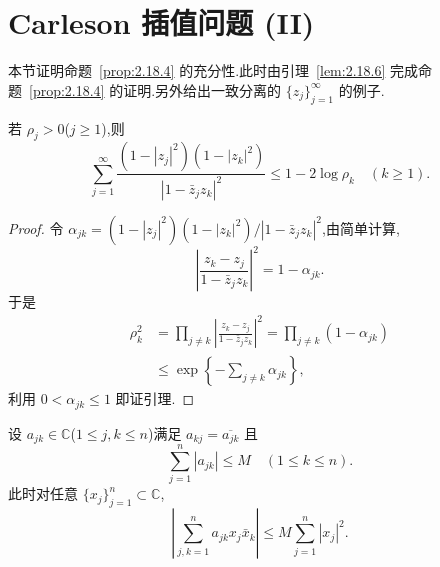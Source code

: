 \section{Carleson 插值问题 (II)}\label{sec:2.19}

本节证明命题~\ref{prop:2.18.4} 的充分性.此时由引理~\ref{lem:2.18.6} 完成命题~\ref{prop:2.18.4} 的证明.另外给出一致分离的 $\{z_{j}\}_{j=1}^{\infty}$ 的例子.

\begin{lemma}\label{lem:2.19.1}
若 $\rho_{j} > 0$($j \geq 1$),则
\begin{equation*}
\sum_{j=1}^{\infty}\frac{(1 - |z_{j}|^{2})(1 - |z_{k}|^{2})}{|1 - \bar{z}_{j}z_{k}|^{2}} \leq 1 - 2\log\rho_{k} \quad (k \geq 1).
\end{equation*}
\end{lemma}

\begin{proof}
令 $\alpha_{jk} = (1 - |z_{j}|^{2})(1 - |z_{k}|^{2})/|1 - \bar{z}_{j}z_{k}|^{2}$,由简单计算,
\begin{equation*}
\left| \frac{z_{k} - z_{j}}{1 - \bar{z}_{j}z_{k}} \right|^{2} = 1 - \alpha_{jk}.
\end{equation*}
于是
\begin{align*}
\rho_{k}^{2} &= \prod_{j \neq k}\left| \frac{z_{k} - z_{j}}{1 - \bar{z}_{j}z_{k}} \right|^{2} = \prod_{j \neq k}(1 - \alpha_{jk}) \\
&\leq \exp\left\{-\sum_{j \neq k}\alpha_{jk}\right\},
\end{align*}
利用 $0 < \alpha_{jk} \leq 1$ 即证引理.
\end{proof}

\begin{lemma}\label{lem:2.19.2}
设 $a_{jk} \in \mathbb{C}$($1 \leq j, k \leq n$)满足 $a_{kj} = \overline{a_{jk}}$ 且
\begin{equation*}
\sum_{j=1}^{n}|a_{jk}| \leq M \quad (1 \leq k \leq n).
\end{equation*}
此时对任意 $\{x_{j}\}_{j=1}^{n} \subset \mathbb{C}$,
\begin{equation*}
\left| \sum_{j,k=1}^{n} a_{jk}x_{j}\bar{x}_{k} \right| \leq M\sum_{j=1}^{n}|x_{j}|^{2}.
\end{equation*}
\end{lemma}

